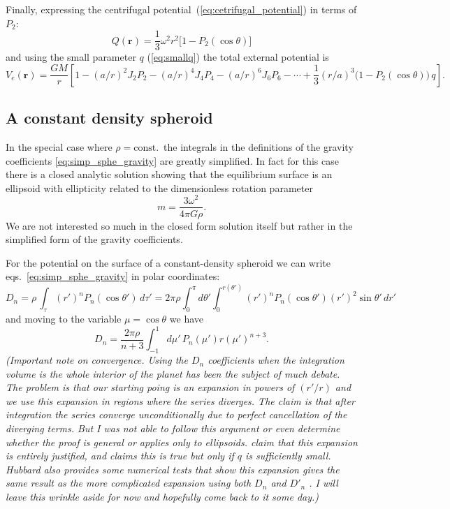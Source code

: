 \documentclass[amsmath,amsfonts,rmp,letterpaper]{revtex4}
\newcommand{\V}[1]{\mathbf{#1}} %
\newcommand{\arr}{\V{r}}
\newcommand{\om}{\omega}
\newcommand{\const}{\mathrm{const.}}
\begin{document}
Finally, expressing the centrifugal potential~(\ref{eq:cetrifugal_potential}) in
terms of $P_2$:
\begin{equation}
Q(\arr) = \frac{1}{3}\omega^2r^2\bigl[1 - P_2(\cos\theta)\bigr]
\end{equation}
and using the small parameter $q$ (\ref{eq:smallq}) the total external potential
is
\begin{equation}\label{eq:total_external_potential}
V_e(\arr) = \frac{GM}{r}\left[1 - (a/r)^2J_2P_2 - (a/r)^4J_4P_4 -
(a/r)^6J_6P_6 - \cdots + \frac{1}{3}(r/a)^3\bigl(1 - 
P_2(\cos\theta)\bigr)\,q\right].
\end{equation}


\subsection{A constant density spheroid} %
\label{sec:a_constant_density_spheroid}
In the special case where $\rho=\const$~the integrals in the definitions of the
gravity coefficients \eqref{eq:simp_sphe_gravity} are greatly simplified. In fact
for this case there is a closed analytic solution showing that the equilibrium
surface is an ellipsoid with ellipticity related to the dimensionless rotation
parameter
\begin{equation}
m = \frac{3\om^2}{4\pi{G}\rho}.
\end{equation}
We are not interested so much in the closed form solution itself but rather in
the simplified form of the gravity coefficients.

For the potential on the surface of a constant-density spheroid we
can write eqs.~\eqref{eq:simp_sphe_gravity} in polar coordinates:
\begin{equation}\label{eq:polar_integral}
D_n = \rho\,\int_\tau (r')^nP_n(\cos\theta')\,d\tau' =
2\pi\rho\int_{0}^{\pi}d\theta'\int_{0}^{r(\theta')}(r')^nP_n(\cos\theta')
(r')^2\sin\theta'\,dr'
\end{equation}
and moving to the variable $\mu=\cos\theta$ we have
\begin{equation}
D_n = \frac{2\pi\rho}{n + 3}\int_{-1}^{1}d\mu'\,P_n(\mu')r(\mu')^{n + 3}.
\end{equation}
\emph{(Important note on convergence. Using the $D_n$ coefficients when the
integration
volume is the whole interior of the planet has been the subject of much debate.
The problem is that our starting poing is an expansion in powers of $(r'/r)$ and
we use this expansion in regions where the series diverges. The claim is that
after integration the series converge unconditionally due to perfect cancellation
of the diverging terms. But I was not able to follow this argument or even
determine whether the proof is general or applies only to ellipsoids.
\citet{Zharkov1978} claim that this expansion is entirely justified, and
\citet{Hubbard2014} claims this is true but only if $q$ is sufficiently small.
Hubbard also provides some numerical tests that show this expansion
gives the same result as the more complicated expansion using both $D_n$ and
$D'_n$ \citep[e.g.][]{Kong2013}. I will leave this wrinkle aside for now and
hopefully come back to it some day.)}
\end{document}
